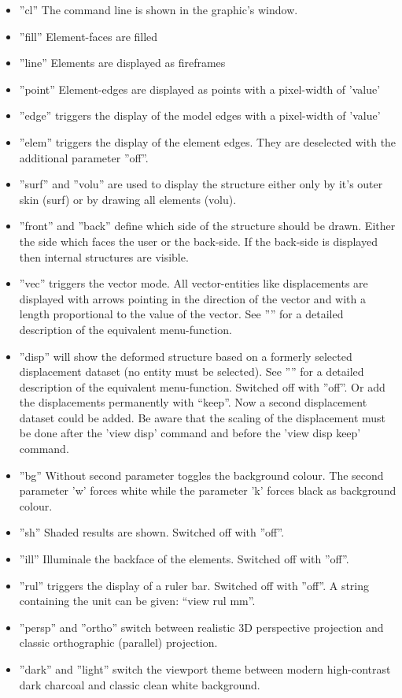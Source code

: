 \documentclass{article}
\begin{document}
\begin{itemize}
\item ''cl'' The command line is shown in the graphic's window. 
\item ''fill'' Element-faces are filled 
\item ''line'' Elements are displayed as fireframes
\item ''point'' Element-edges are displayed as points with a pixel-width of 'value'
\item ''edge'' triggers the display of the model edges with a pixel-width of 'value'
\item ''elem'' triggers the display of the element edges. They are deselected with the additional parameter ''off''.
\item ''surf'' and ''volu'' are used to display the structure either only by it's outer skin (surf) or by drawing all elements (volu). \item ''front'' and ''back'' define which side of the structure should be drawn. Either the side which faces the user or the back-side. If the back-side is displayed then internal structures are visible. 
\item ''vec'' triggers the vector mode. All vector-entities like displacements are displayed with arrows pointing in the direction of the vector and with a length proportional to the value of the vector. See '''' for a detailed description of the equivalent menu-function.
\item ''disp'' will show the deformed structure based on a formerly selected displacement dataset (no entity must be selected). See '''' for a detailed description of the equivalent menu-function. Switched off with ”off”. Or add the displacements permanently with ``keep''. Now a second displacement dataset could be added. Be aware that the scaling of the displacement must be done after the 'view disp' command and before the 'view disp keep' command.
\item ''bg'' Without second parameter toggles the background colour. The second parameter 'w' forces white while the parameter 'k' forces black as background colour.
\item ''sh'' Shaded results are shown. Switched off with ''off''. 
\item ''ill'' Illuminale the backface of the elements. Switched off with ''off''. 
\item ''rul'' triggers the display of a ruler bar. Switched off with ''off''. A string containing the unit can be given: ``view rul mm''. 
\item ''persp'' and ''ortho'' switch between realistic 3D perspective projection and classic orthographic (parallel) projection.
\item ''dark'' and ''light'' switch the viewport theme between modern high-contrast dark charcoal and classic clean white background.
\end{itemize}  
\end{document}
